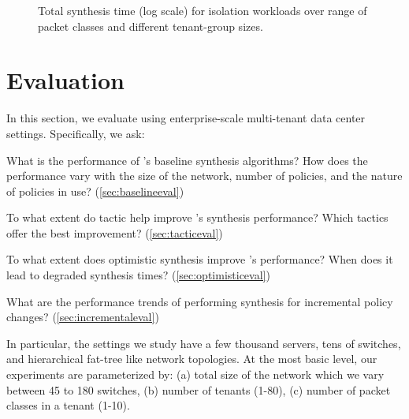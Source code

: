 \begin{figure*}[width=2\columnwidth]
	\centering
	\caption{\label{fig:isolation}
		Total synthesis time (log scale) for isolation workloads over range of packet classes and different tenant-group sizes.}
\end{figure*}

\section{Evaluation}
In this section, we evaluate \Name using 
enterprise-scale multi-tenant data
center settings. 
Specifically, we ask:

\begin{compactitemize}

\item What is the performance of \Name's baseline synthesis
  algorithms? How does the performance vary with the size of the
  network, number of policies, and the nature of policies in use? (\cref{sec:baselineeval})

\item To what extent do tactic help improve \Name's synthesis
  performance? Which tactics offer the best improvement? (\cref{sec:tacticeval})

\item To what extent does optimistic synthesis improve \Name's
  performance? When does it lead to degraded synthesis times? (\cref{sec:optimisticeval})

\item What are the performance trends of performing
synthesis for incremental policy changes? (\cref{sec:incrementaleval})

\end{compactitemize}
 In
particular, the settings we study have a few thousand servers, tens of
switches, and hierarchical fat-tree like network topologies. At the
most basic level, our experiments are parameterized by: (a) total size
of the network which we vary between 45 to 180 switches, (b) number of
tenants (1-80), (c) number of packet classes in a tenant (1-10). 

